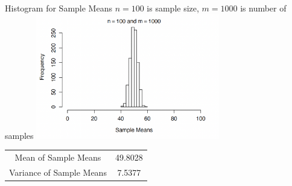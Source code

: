 \documentclass[12pt]{beamer}
\begin{document}
\begin{frame}{Histogram for Sample Means}
	$n=100$ is sample size, $m=1000$ is number of samples
	\centering
	\includegraphics[width=8cm]{histo6.png}
	\begin{tabular}{cc}
		\toprule
		Mean of Sample Means& 49.8028\\
		Variance of Sample Means&7.5377\\
		\bottomrule
	\end{tabular}
\end{frame}
\end{document}
